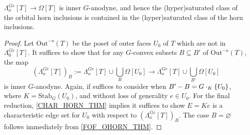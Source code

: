 \documentclass[a4paper,10pt,draft]{article}%
\begin{document}
{\begin{proposition}
      \label{ORB_HORN_THM_B}
      $\Lambda_o^{Ge}[T] \to \Omega[T]$ is inner $G$-anodyne, and hence
      the (hyper)saturated class of the orbital horn inclusions is contained in
      the (hyper)saturated class of the horn inclusions.
\end{proposition}
\begin{proof}
      Let $\mathrm{Out}^{-o}(T)$ be the poset of outer faces $U_0$ of $T$ which are not in $\Lambda_0^{Ge}[T]$.
      It suffices to show that for any $G$-convex subsets $B \subseteq B'$ of $\mathrm{Out}^{-o}(T)$, the map
      \begin{equation}
            \label{ORB_HORN_EQ}
            \left(\Lambda^{G e}_{o}[T]\right)_B
            := \Lambda_o^{Ge}[T] \cup \mathop{\bigcup}\limits_{B}\Omega[U_0]
            \to
            \Lambda_o^{Ge}[T] \cup \mathop{\bigcup}\limits_{B'}\Omega[U_0]
      \end{equation}
      is inner $G$-anodyne.
      Again, if suffices to consider when $B' - B = G \cdot_K \left\{U_0\right\}$, where $K = \mathrm{Stab}_G(U_0)$, and
      without loss of generality $e \in U_0$.
      For the final reduction, \cref{CHAR_HORN_THM} implies it suffices to show
      $E = K e$ is a characteristic edge set for
      $U_0$ with respect to $(\Lambda^{G e}_o[T])_B$.
      The case $B = \varnothing$ follows immediately from \cref{FOF_OHORN_THM}.    
      

\end{proof}}
\end{document}
